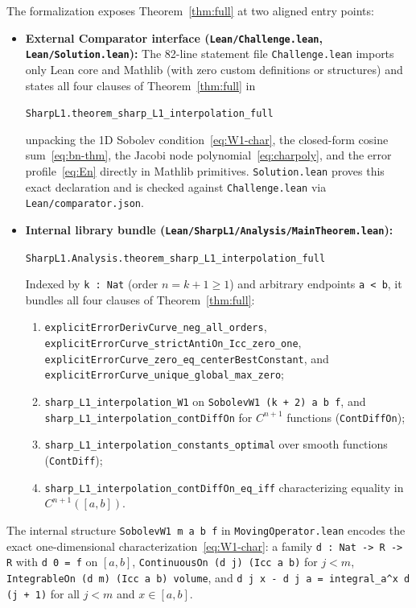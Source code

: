 \documentclass[11pt,a4paper]{article}
\newcommand{\code}[1]{\nolinkurl{#1}}
\theoremstyle{remark}
\numberwithin{equation}{section}
\begin{document}
The formalization exposes Theorem~\ref{thm:full} at two aligned entry points:
\begin{itemize}[leftmargin=1.8em]
    \item \textbf{External Comparator interface (\code{Lean/Challenge.lean}, \code{Lean/Solution.lean}):} The 82-line statement file \code{Challenge.lean} imports only Lean core and Mathlib (with zero custom definitions or structures) and states all four clauses of Theorem~\ref{thm:full} in
    \begin{center}
        \code{SharpL1.theorem_sharp_L1_interpolation_full}
    \end{center}
    unpacking the 1D Sobolev condition~\eqref{eq:W1-char}, the closed-form cosine sum~\eqref{eq:bn-thm}, the Jacobi node polynomial~\eqref{eq:charpoly}, and the error profile~\eqref{eq:En} directly in Mathlib primitives. \code{Solution.lean} proves this exact declaration and is checked against \code{Challenge.lean} via \code{Lean/comparator.json}.
    \item \textbf{Internal library bundle (\code{Lean/SharpL1/Analysis/MainTheorem.lean}):}
    \begin{center}
        \code{SharpL1.Analysis.theorem_sharp_L1_interpolation_full}
    \end{center}
    Indexed by \code{k : Nat} (order $n = k + 1 \ge 1$) and arbitrary endpoints \code{a < b}, it bundles all four clauses of Theorem~\ref{thm:full}:
    \begin{enumerate}[label=\textup{(\roman*)}]
        \item \code{explicitErrorDerivCurve_neg_all_orders}, \code{explicitErrorCurve_strictAntiOn_Icc_zero_one}, \code{explicitErrorCurve_zero_eq_centerBestConstant}, and \code{explicitErrorCurve_unique_global_max_zero};
        \item \code{sharp_L1_interpolation_W1} on \code{SobolevW1 (k + 2) a b f}, and \code{sharp_L1_interpolation_contDiffOn} for $C^{n+1}$ functions (\code{ContDiffOn});
        \item \code{sharp_L1_interpolation_constants_optimal} over smooth functions (\code{ContDiff});
        \item \code{sharp_L1_interpolation_contDiffOn_eq_iff} characterizing equality in $C^{n+1}([a,b])$.
    \end{enumerate}
\end{itemize}

The internal structure \code{SobolevW1 m a b f} in \code{MovingOperator.lean} encodes the exact one-dimensional characterization~\eqref{eq:W1-char}: a family \code{d : Nat -> R -> R} with \code{d 0 = f} on $[a,b]$, \code{ContinuousOn (d j) (Icc a b)} for $j < m$, \code{IntegrableOn (d m) (Icc a b) volume}, and \code{d j x - d j a = integral_a^x d (j + 1)} for all $j < m$ and $x \in [a,b]$.
\end{document}
